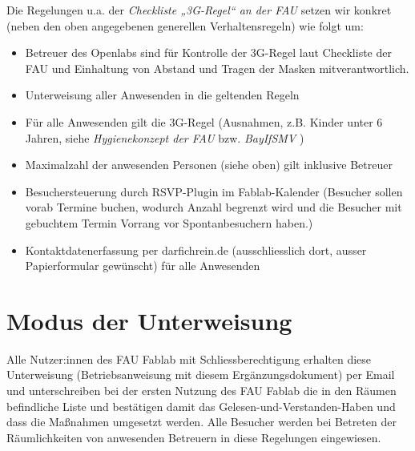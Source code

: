 \documentclass[13pt]{\basedir/fablab-document}
\begin{document}
Die Regelungen u.a. der \emph{Checkliste „3G-Regel“ an der FAU} setzen wir konkret (neben den oben angegebenen generellen Verhaltensregeln) wie folgt um:
\begin{itemize}
  \item  Betreuer des Openlabs sind für Kontrolle der 3G-Regel laut Checkliste der FAU und Einhaltung von Abstand und Tragen der Masken mitverantwortlich.
  \item  Unterweisung aller Anwesenden in die geltenden Regeln
  \item  Für alle Anwesenden gilt die 3G-Regel (Ausnahmen, z.B. Kinder unter 6 Jahren, siehe \emph{Hygienekonzept der FAU} bzw. \emph{BayIfSMV} )
  \item  Maximalzahl der anwesenden Personen (siehe oben) gilt inklusive Betreuer
  \item  Besuchersteuerung durch RSVP-Plugin im Fablab-Kalender (Besucher sollen vorab Termine buchen, wodurch Anzahl begrenzt wird und die Besucher mit gebuchtem Termin Vorrang vor Spontanbesuchern haben.)
  \item  Kontaktdatenerfassung per darfichrein.de (ausschliesslich dort, ausser Papierformular gewünscht) für alle Anwesenden
\end{itemize}



\section{Modus der Unterweisung}
Alle Nutzer:innen des FAU Fablab mit Schliessberechtigung erhalten diese Unterweisung (Betriebsanweisung mit diesem Ergänzungsdokument) per Email und unterschreiben bei der ersten Nutzung des FAU Fablab die in den Räumen befindliche Liste und bestätigen damit das Gelesen-und-Verstanden-Haben und dass die Maßnahmen umgesetzt werden.
Alle Besucher werden bei Betreten der Räumlichkeiten von anwesenden Betreuern in diese Regelungen eingewiesen.

\end{document}
